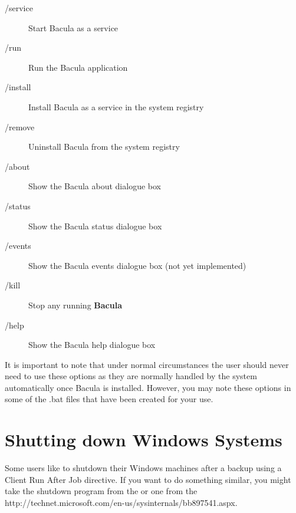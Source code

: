 \begin{description}

\item [/service ]
   Start Bacula as a service 

\item [/run ]
   Run the Bacula application  

\item [/install ]
   Install Bacula as a service in the system registry  

\item [/remove ]
   Uninstall Bacula from the system registry  

\item [/about ]
   Show the Bacula about dialogue box  

\item [/status ]
   Show the Bacula status dialogue box  

\item [/events ]
   Show the Bacula events dialogue box (not  yet implemented)  

\item [/kill ]
   Stop any running {\bf Bacula}  

\item [/help ]
   Show the Bacula help dialogue box 
\end{description}

It is important to note that under normal circumstances the user should never
need to use these options as they are normally handled by the system
automatically once Bacula is installed. However, you may note these options in
some of the .bat files that have been created for your use. 

\section{Shutting down Windows Systems}

Some users like to shutdown their Windows machines after a backup using a
Client Run After Job directive. If you want to do something similar, you might
take the shutdown program from the 
 or one from the 
{http://technet.microsoft.com/en-us/sysinternals/bb897541.aspx}.
